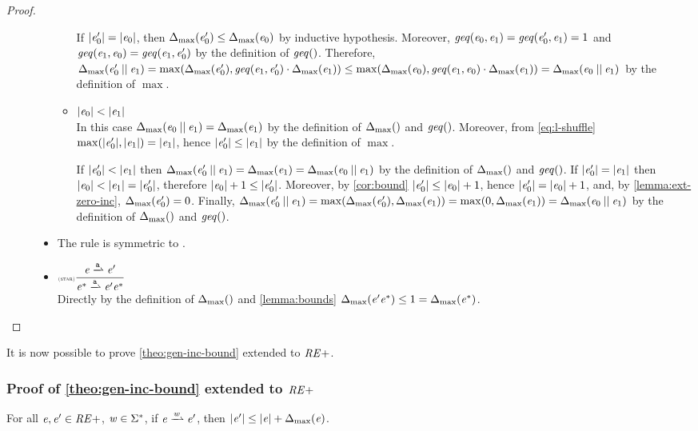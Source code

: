 \begin{proof}
\begin{description}
\begin{itemize}
\begin{itemize}
                 If ${\mid}{\mathit {e}_0'}{\mid}={\mid}{\mathit {e}_0}{\mid}$, then ${\Delta_{\max}}({\mathit {e}_0'})\leq{\Delta_{\max}}({\mathit {e}_0})$ by inductive hypothesis. Moreover,
                 $\mathit{geq}({\mathit {e}_0},{\mathit {e}_1})=\mathit{geq}({\mathit {e}'_0},{\mathit {e}_1})=1$ and $\mathit{geq}({\mathit {e}_1},{\mathit {e}_0})=\mathit{geq}({\mathit {e}_1},{\mathit {e}'_0})$ by the definition of $\mathit{geq}()$.
                 Therefore, ${\Delta_{\max}}({\mathit {e}_0'\mathbin{||}\mathit {e}_1})=\max({\Delta_{\max}}({\mathit {e}'_0}),\mathit{geq}({\mathit {e}_1},{\mathit {e}_0'})\cdot{\Delta_{\max}}({\mathit {e}_1}))\leq\max({\Delta_{\max}}({\mathit {e}_0}),\mathit{geq}({\mathit {e}_1},{\mathit {e}_0})\cdot{\Delta_{\max}}({\mathit {e}_1}))={\Delta_{\max}}({\mathit {e}_0\mathbin{||}\mathit {e}_1})$ by the definition of $\max$.
           \item ${\mid}{\mathit {e}_0}{\mid}<{\mid}{\mathit {e}_1}{\mid}$\\
                 In this case ${\Delta_{\max}}({\mathit {e}_0\mathbin{||}\mathit {e}_1})={\Delta_{\max}}({\mathit {e}_1})$ by the definition of ${\Delta_{\max}}({})$ and $\mathit{geq}()$. Moreover, from \cref{eq:l-shuffle} $\max({\mid}{\mathit {e}_0'}{\mid},{\mid}{\mathit {e}_1}{\mid})={\mid}{\mathit {e}_1}{\mid}$, hence ${\mid}{\mathit {e}_0'}{\mid}\leq{\mid}{\ensuremath{\mathit {e}}_1}{\mid}$ by the definition of $\max$.

                 If ${\mid}{\mathit {e}_0'}{\mid}<{\mid}{\mathit {e}_1}{\mid}$ then ${\Delta_{\max}}({\mathit {e}_0'\mathbin{||}\mathit {e}_1})={\Delta_{\max}}({\mathit {e}_1})={\Delta_{\max}}({\mathit {e}_0\mathbin{||}\mathit {e}_1})$ by the definition of ${\Delta_{\max}}({})$ and $\mathit{geq}()$. If ${\mid}{\mathit {e}_0'}{\mid}={\mid}{\mathit {e}_1}{\mid}$ then ${\mid}{\mathit {e}_0}{\mid}<{\mid}{\mathit {e}_1}{\mid}={\mid}{\mathit {e}_0'}{\mid}$, therefore ${\mid}{\mathit {e}_0}{\mid}+1\leq{\mid}{\ensuremath{\mathit {e}}_0'}{\mid}$. Moreover, by \cref{cor:bound} ${\mid}{\mathit {e}'_0}{\mid}\leq{\mid}{\ensuremath{\mathit {e}}_0}{\mid}+1$, hence ${\mid}{\mathit {e}_0'}{\mid}={\mid}{\mathit {e}_0}{\mid}+1$, and, by \cref{lemma:ext-zero-inc}, ${\Delta_{\max}}({\mathit {e}_0'})=0$. Finally,
                 ${\Delta_{\max}}({\mathit {e}_0'\mathbin{||}\mathit {e}_1})=\max({\Delta_{\max}}({\mathit {e}_0'}),{\Delta_{\max}}({\mathit {e}_1}))=\max(0,{\Delta_{\max}}({\mathit {e}_1}))={\Delta_{\max}}({\mathit {e}_0\mathbin{||}\mathit {e}_1})$ by the definition of ${\Delta_{\max}}({})$ and $\mathit{geq}()$.
          \end{itemize}


    \item The rule  is symmetric to .
    \item $\Rule{star}{\re\parDer{\sym}\re'}{\starop{\re}\parDer{\sym}\re'\catop\starop{\re}}{}$\\[2ex]
          Directly by the definition of ${\Delta_{\max}}({})$ and \cref{lemma:bounds}
          ${\Delta_{\max}}({\mathit {e}'{\mathit {e}}^*})\leq 1={\Delta_{\max}}({{\mathit {e}}^*})$.
   \end{itemize}
 \end{description}
\end{proof}

It is now possible to prove \cref{theo:gen-inc-bound} extended to $\mathit {RE+}$.

\subsubsection*{Proof of \cref{theo:gen-inc-bound} extended to $\mathit {RE+}$
}
For all $\mathit {e},\mathit {e}'\in\mathit {RE+}$, $\mathit {w}\in\Sigma^*$, if $\re\parDer{\word}\re'$, then ${\mid}{\mathit {e}'}{\mid}\leq {\mid}{\ensuremath{\mathit {e}}}{\mid}+{\Delta_{\max}}({\mathit {e}})$.


